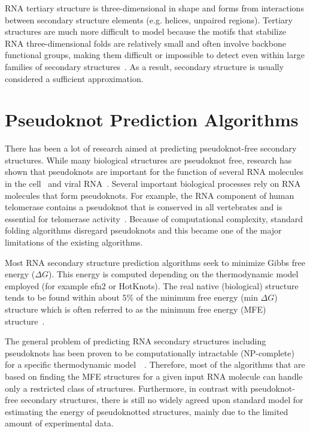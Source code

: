 \documentclass{doublecol-new}
\theoremstyle{TH}{
\newtheorem{lemma}{Lemma}
\newtheorem{theorem}[lemma]{Theorem}
\newtheorem{corrolary}[lemma]{Corrolary}
\newtheorem{conjecture}[lemma]{Conjecture}
\newtheorem{proposition}[lemma]{Proposition}
\newtheorem{claim}[lemma]{Claim}
\newtheorem{stheorem}[lemma]{Wrong Theorem}
\newtheorem{algorithm}{Algorithm}
}
\theoremstyle{THrm}{
\newtheorem{definition}{Definition}
\newtheorem{question}{Question}
\newtheorem{remark}{Remark}
\newtheorem{scheme}{Scheme}
}
\theoremstyle{THhit}{
\newtheorem{case}{Case}[section]
}
\begin{document}
RNA tertiary structure is three-dimensional in shape and forms from interactions between
secondary structure elements (e.g. helices, unpaired regions). Tertiary structures
are  much more difficult to model because the motifs that stabilize RNA three-dimensional
folds are relatively small and often involve backbone functional groups, making
them difficult or impossible to detect even within large families of
secondary structures~\cite{doudna_2000}.
As a result, secondary structure is usually considered a sufficient approximation.

\section{Pseudoknot Prediction Algorithms}
There has been a lot of research aimed at predicting 
pseudoknot-free secondary structures. While many biological
structures are pseudoknot free, research has shown that pseudoknots
are important for the function of several RNA molecules in the
cell~\cite{staple-butcher-05, DBLP:journals/nar/BatenburgGP01} and
viral RNA~\cite{deiman-pleij-97}.
Several important biological processes rely on RNA molecules that form pseudoknots.
For example, the RNA component of human telomerase contains a pseudoknot that is conserved
in all vertebrates and is essential for telomerase activity~\cite{Jiunn-LiangChen06072005}.
Because of computational
complexity, standard folding algorithms disregard pseudoknots and
this became one of the major limitations of the existing algorithms.

Most RNA secondary structure prediction algorithms seek to minimize Gibbs free energy ($\Delta{G}$). 
This energy is computed depending on the thermodynamic model employed (for example efn2 or HotKnots). 
The real native (biological) structure tends to be found within about $5\%$ of the minimum free energy (min $\Delta{G}$) structure which is often referred to as the  minimum free energy (MFE) structure~\cite{rivas_2013}. 

The general problem of predicting RNA secondary structures including
pseudoknots has been proven to be computationally intractable
(NP-complete) for a specific thermodynamic
model~\cite{lyngs00pseudoknots}~\cite{lyngso-pedersen-00}.
Therefore, most of the algorithms that are based on finding the MFE
structures for a given input RNA molecule can handle only a
restricted class of structures. Furthermore, in contrast with
pseudoknot-free secondary structures, there is still no widely
agreed upon standard model for estimating the energy of
pseudoknotted structures, mainly due to the limited amount of experimental data.
\end{document}
